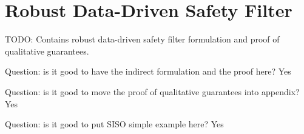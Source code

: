 \chapter{Robust Data-Driven Safety Filter}\label{chap:robust-ddsf-lti}
TODO: Contains robust data-driven safety filter formulation and proof of qualitative guarantees.

Question: is it good to have the indirect formulation and the proof here? Yes

Question: is it good to move the proof of qualitative guarantees into appendix? Yes

Question: is it good to put SISO simple example here? Yes

